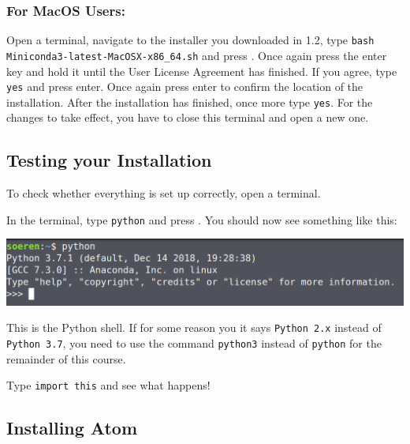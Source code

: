 \subsubsection*{For MacOS Users:}

Open a terminal, navigate to the installer you downloaded in 1.2, type \texttt{bash Miniconda3-latest-MacOSX-x86\_64.sh} and press \keys{\return}. Once again press the enter key and hold it until the User License Agreement has finished. If you agree, type \texttt{yes} and press enter. Once again press enter to confirm the location of the installation. After the installation has finished, once more type \texttt{yes}. For the changes to take effect, you have to close this terminal and open a new one.


\subsection{Testing your Installation}

To check whether everything is set up correctly, open a terminal.

\vspace{1em}

\noindent In the terminal, type \texttt{python} and press \keys{\return}. You should now see something like this:

\vspace{1em}

\noindent \includegraphics[width=\textwidth]{01_Introduction/python_shell.png}

\vspace{1em}

\noindent This is the Python shell. If for some reason you it says \texttt{Python 2.x} instead of \texttt{Python 3.7}, you need to use the command \texttt{python3} instead of \texttt{python} for the remainder of this course.

\vspace{1em}

\noindent Type \texttt{import this} and see what happens!

\subsection{Installing Atom}

